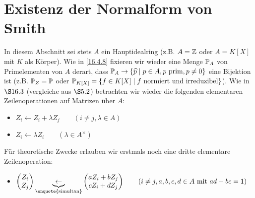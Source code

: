 \documentclass[../../main.tex]{subfiles}
\begin{document}
\section{Existenz der Normalform von Smith}

In diesem Abschnitt sei stets $A$ ein Hauptidealring (z.B. $A=\Z$ oder $A=K[X]$ mit $K$ als Körper). Wie in \ref{16.4.8} fixieren wir wieder eine Menge $\P_A$ von Primelementen von $A$ derart, dass $\P_A\to\{\tc p\mid p\in A,p\text{ prim},p\neq 0\}$ eine Bijektion ist (z.B. $\P_Z=\P$ oder $\P_{K[X]}=\{f\in K[X]\mid f\text{ normiert und irreduzibel}\}$). Wie in  $\S16.3$ (vergleiche aus $\S5.2$) betrachten wir wieder die folgenden elementaren Zeilenoperationen auf Matrizen über $A$:
\begin{itemize}
    \item
        $Z_i\leftarrow Z_i+\lambda Z_j \qquad (i\neq j, \lambda\in A)$
    \item
        $Z_i\leftarrow \lambda Z_i\qquad(\lambda\in A^\times)$
\end{itemize}
Für theoretische Zwecke erlauben wir erstmals noch eine dritte elementare Zeilenoperation:
\begin{itemize}
    \item
        $
        \begin{pmatrix*}
            Z_i\\ Z_j
        \end{pmatrix*}
        \underbrace{\leftarrow}_{\text{\enquote{simultan}}}
        \begin{pmatrix*}
            aZ_i+bZ_j\\ cZ_i+dZ_j
        \end{pmatrix*}
        \qquad( i\neq j, a,b,c,d\in A\text{ mit }ad-bc=1)$
\end{itemize}
\end{document}
